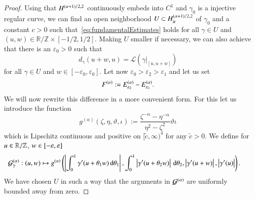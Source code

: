 \begin{proof}
 
 Using that $\W$ continuously embeds into $C^1$ and $\gamma_0$ is a injective regular curve, we can find
 an open neighborhood $U \subset \Wir$  of $\gamma_0$ and 
 a constant $c >0$ such that~\eqref{eq:fundamentalEstimates} holds
for all $\gamma \in U$ and $(u,w) \in \mathbb R / \mathbb Z \times [-1/2,1/2]$. Making $U$ smaller if
necessary, we can also achieve that there is an $\varepsilon_0 >0$ such that
\begin{equation*}
 d_{\gamma}(u+w,u) = \mathscr L (\gamma|_{[u,u+w]})
\end{equation*}
for all $\gamma \in U$ and  $w \in [-\varepsilon_0, \varepsilon_0]$.
 \renewcommand{\gt}{\gamma}%
 Let now $\varepsilon_0 > \varepsilon_2 > \varepsilon_1$ and let us set 
 \[ F^{(\alpha)}:= \E_{\varepsilon_2} - \E_{\varepsilon_1}. \]
 We will now rewrite
 this difference in a more convenient form. For this let us 
 introduce the function
 \[ g^{(\alpha)}(\zeta,\eta,\vartheta,\iota) := \frac{\zeta^{-\alpha}-\eta^{-\alpha}}{\eta^2-\zeta^2}\vartheta\iota \]
 which is Lipschitz continuous and positive on $[\tilde c,\infty)^4$ for any $\tilde c>0$.
 We define for $u\in\R/\Z$, $w\in[-\eps,\eps]$
 \begin{align*}
  \G[\gt]:(u,w) &\mapsto g^{(\alpha)}\br{\abs{\int_0^1\dgt(u+\theta_1w)\d\theta_1},\int_0^1\abs{\dgt(u+\theta_2w)}\d\theta_2,\abs{\dgt(u+w)},\abs{\dgt(u)}}.
 \end{align*}
 We have chosen $U$ in such a way that the arguments in $\G[]$ are 
 uniformly bounded away from zero.


\end{proof}
